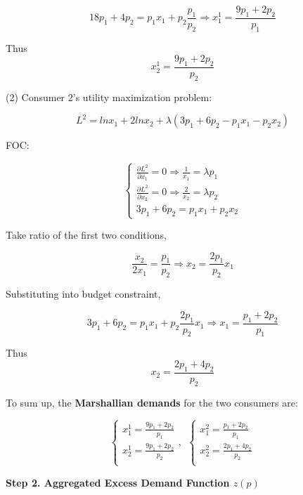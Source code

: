 \documentclass{article}
\begin{document}
$$18p_1 +4p_2 = p_1x_1 + p_2\frac{p_1}{p_2}   \Rightarrow x^1_1 =\frac{9p_1+2p_2}{p_1}$$

Thus $$x^1_2 = \frac{9p_1+2p_2}{p_2}$$ 

(2) Consumer 2's utility maximization problem:

\vspace{3mm}

$$L^2 = ln x_1 + 2ln x_2 + \lambda (3p_1 +6p_2 - p_1x_1 -p_2x_2) $$

FOC:

\begin{equation}
    \begin{cases}
\frac{\partial L^2}{\partial x_1} = 0  \Rightarrow \frac{1}{x_1} = \lambda p_1 \\
\frac{\partial L^2}{\partial x_2} = 0  \Rightarrow \frac{2}{x_2} = \lambda p_2 \\
3p_1 +6p_2 = p_1x_1 + p_2x_2
    \end{cases}
    \nonumber
\end{equation}

Take ratio of the first two conditions,

$$\frac{x_2}{2x_1} = \frac{p_1}{p_2} \Rightarrow x_2 = \frac{2p_1}{p_2}  x_1$$

Substituting into budget constraint,

$$3p_1 +6p_2 = p_1x_1 + p_2\frac{2p_1}{p_2}  x_1   \Rightarrow x_1 =\frac{p_1+2p_2}{p_1}$$

Thus $$x_2 = \frac{2p_1+4p_2}{p_2}$$ 

To sum up, the \textbf{Marshallian demands} for the two consumers are:


\begin{equation}
    \begin{cases}
x^1_1 = \frac{9p_1+2p_2}{p_1} \\
x^1_2 = \frac{9p_1+2p_2}{p_2}  \\
    \end{cases}
, \ \
    \begin{cases}
x^2_1 = \frac{p_1+2p_2}{p_1} \\
x^2_2 = \frac{2p_1+4p_2}{p_2}  \\
    \end{cases}
\label{eq:demand}
\end{equation}

\vspace{3mm}

\textbf{Step 2. Aggregated Excess Demand Function $z(p)$}

\vspace{3mm}
\end{document}
